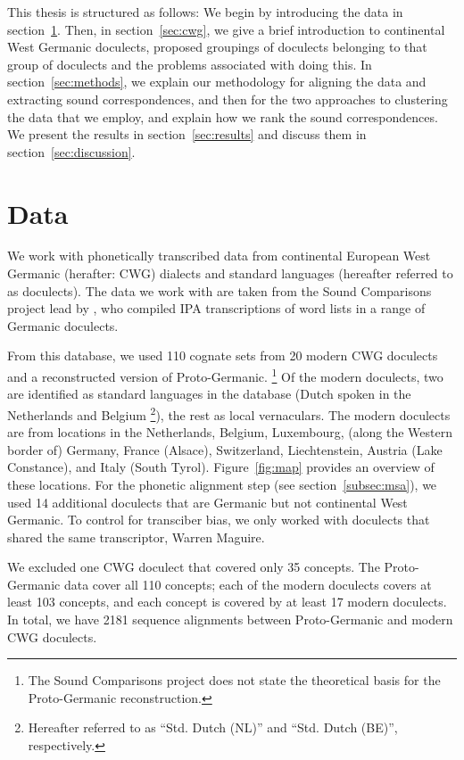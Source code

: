 \documentclass[a4paper]{article}
\begin{document}
This thesis is structured as follows:
We begin by introducing the data in section~\ref{sec:data}.
Then, in section~\ref{sec:cwg},
we give a brief introduction to continental West Germanic doculects,
proposed groupings of doculects belonging to that group of doculects
and the problems associated with doing this.
In section~\ref{sec:methods}, we explain our methodology for
aligning the data and extracting sound correspondences,
and then for the two approaches to clustering the data that we employ,
and explain how we rank the sound correspondences.
We present the results in section~\ref{sec:results}
and discuss them in section~\ref{sec:discussion}.

\newpage
\section{Data}
\label{sec:data}

We work with phonetically transcribed data from
continental European West Germanic (herafter: CWG) dialects and standard languages
(hereafter referred to as doculects).
The data we work with are taken from the Sound Comparisons project
lead by \citet{heggarty2018sound}, who compiled IPA transcriptions of word lists
in a range of Germanic doculects.

From this database,
we used 110 cognate sets from 20 modern CWG doculects
and a reconstructed version of Proto-Germanic.
\footnote{
The Sound Comparisons project does not state
the theoretical basis for the Proto-Germanic reconstruction.
}
Of the modern doculects, two are identified as standard languages
in the database (Dutch spoken in the Netherlands and Belgium
\footnote{
Hereafter referred to as ``Std. Dutch (NL)'' and ``Std. Dutch (BE)'', respectively.
}),
the rest as local vernaculars.
The modern doculects are from locations in the
Netherlands, Belgium, Luxembourg, (along the Western border of) Germany,
France (Alsace), Switzerland, Liechtenstein, Austria (Lake Constance), and Italy (South Tyrol).
Figure~\ref{fig:map} provides an overview of these locations.
For the phonetic alignment step (see section~\ref{subsec:msa}),
we used 14 additional doculects that are Germanic but not continental West Germanic. 
To control for transciber bias, we only worked with doculects that shared the same transcriptor, Warren Maguire.

We excluded one CWG doculect that covered only 35 concepts. %
The Proto-Germanic data cover all 110 concepts; each of the modern doculects covers at least 103 concepts, and each concept is covered by at least 17 modern doculects.
In total, we have 2181 sequence alignments between Proto-Germanic and modern CWG doculects.
\end{document}
